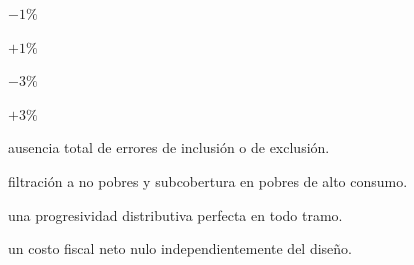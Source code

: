 \begin{opts}
    \item $-1\%$
    \item $+1\%$
    \item $-3\%$
    \item $+3\%$
\end{opts}

\begin{opts}
    \item ausencia total de errores de inclusión o de exclusión.
    \item filtración a no pobres y subcobertura en pobres de alto consumo.
    \item una progresividad distributiva perfecta en todo tramo.
    \item un costo fiscal neto nulo independientemente del diseño.
\end{opts}

